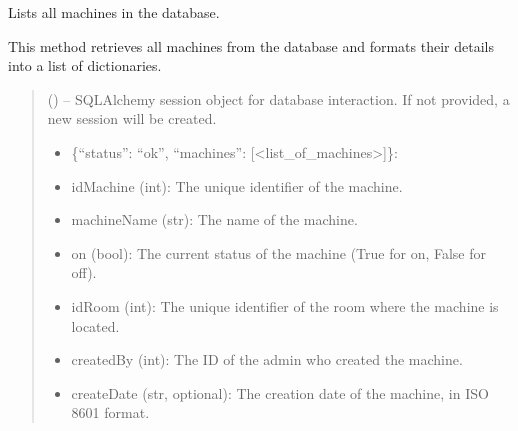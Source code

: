 \documentclass[letterpaper,10pt,english]{sphinxmanual}
\begin{document}
\begin{fulllineitems}
\begin{fulllineitems}
\label{\detokenize{app.controllers:app.controllers.machine_controller.MachineController.list_machines}}
\pysigstartsignatures
\pysiglinewithargsret
{}
{}
{}
\pysigstopsignatures
\sphinxAtStartPar
Lists all machines in the database.

\sphinxAtStartPar
This method retrieves all machines from the database and formats their details
into a list of dictionaries.
\begin{quote}\begin{description}
\sphinxAtStartPar
{} (\sphinxstyleliteralemphasis{\sphinxupquote{, }}) – SQLAlchemy session object for database interaction.
If not provided, a new session will be created.

\sphinxAtStartPar
\begin{description}
\begin{itemize}
\item {} 
\sphinxAtStartPar
\{“status”: “ok”, “machines”: {[}<list\_of\_machines>{]}\}:

\end{itemize}
\begin{description}
\begin{itemize}
\item {} 
\sphinxAtStartPar
idMachine (int): The unique identifier of the machine.

\item {} 
\sphinxAtStartPar
machineName (str): The name of the machine.

\item {} 
\sphinxAtStartPar
on (bool): The current status of the machine (True for on, False for off).

\item {} 
\sphinxAtStartPar
idRoom (int): The unique identifier of the room where the machine is located.

\item {} 
\sphinxAtStartPar
createdBy (int): The ID of the admin who created the machine.

\item {} 
\sphinxAtStartPar
createDate (str, optional): The creation date of the machine, in ISO 8601 format.


\end{itemize}
\end{description}
\end{description}
\end{description}
\end{quote}
\end{fulllineitems}
\end{fulllineitems}
\end{document}
